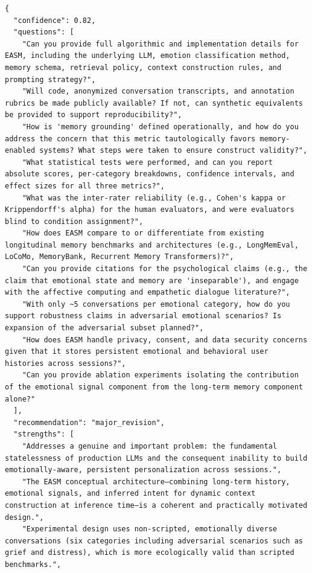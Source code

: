 \documentclass[11pt]{article}
\begin{document}
\begin{verbatim}
{
  "confidence": 0.82,
  "questions": [
    "Can you provide full algorithmic and implementation details for EASM, including the underlying LLM, emotion classification method, memory schema, retrieval policy, context construction rules, and prompting strategy?",
    "Will code, anonymized conversation transcripts, and annotation rubrics be made publicly available? If not, can synthetic equivalents be provided to support reproducibility?",
    "How is 'memory grounding' defined operationally, and how do you address the concern that this metric tautologically favors memory-enabled systems? What steps were taken to ensure construct validity?",
    "What statistical tests were performed, and can you report absolute scores, per-category breakdowns, confidence intervals, and effect sizes for all three metrics?",
    "What was the inter-rater reliability (e.g., Cohen's kappa or Krippendorff's alpha) for the human evaluators, and were evaluators blind to condition assignment?",
    "How does EASM compare to or differentiate from existing longitudinal memory benchmarks and architectures (e.g., LongMemEval, LoCoMo, MemoryBank, Recurrent Memory Transformers)?",
    "Can you provide citations for the psychological claims (e.g., the claim that emotional state and memory are 'inseparable'), and engage with the affective computing and empathetic dialogue literature?",
    "With only ~5 conversations per emotional category, how do you support robustness claims in adversarial emotional scenarios? Is expansion of the adversarial subset planned?",
    "How does EASM handle privacy, consent, and data security concerns given that it stores persistent emotional and behavioral user histories across sessions?",
    "Can you provide ablation experiments isolating the contribution of the emotional signal component from the long-term memory component alone?"
  ],
  "recommendation": "major_revision",
  "strengths": [
    "Addresses a genuine and important problem: the fundamental statelessness of production LLMs and the consequent inability to build emotionally-aware, persistent personalization across sessions.",
    "The EASM conceptual architecture—combining long-term history, emotional signals, and inferred intent for dynamic context construction at inference time—is a coherent and practically motivated design.",
    "Experimental design uses non-scripted, emotionally diverse conversations (six categories including adversarial scenarios such as grief and distress), which is more ecologically valid than scripted benchmarks.",

\end{verbatim}
\end{document}
